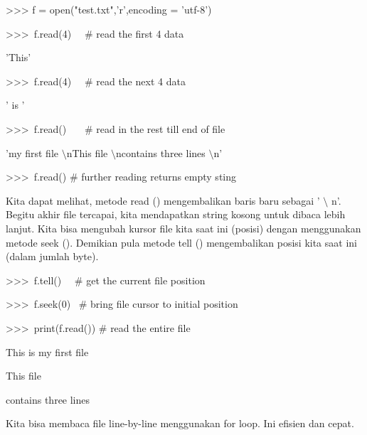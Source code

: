 \vspace{12pt}
\vspace{12pt}
\noindent 
>>> f = open("test.txt",'r',encoding = 'utf-8') \par
\noindent 
>>>~f.read(4)~~   $  \#  $ read the first 4 data \par
\noindent 
'This' \par
\vspace{12pt}
\noindent 
>>>~f.read(4)~~   $  \#  $ read the next 4 data \par
\noindent 
' is ' \par
\vspace{12pt}
\noindent 
>>>~f.read()~~~   $  \#  $ read in the rest till end of file \par
\noindent 
'my first file $  \setminus  $nThis file $  \setminus  $ncontains three lines $  \setminus  $n' \par
\vspace{12pt}
\noindent 
>>>~f.read()   $  \#  $ further reading returns empty sting \par
\vspace{12pt}
Kita dapat melihat, metode read () mengembalikan baris baru sebagai ' $  \setminus  $ n'. Begitu akhir file tercapai, kita mendapatkan string kosong untuk dibaca lebih lanjut. Kita bisa mengubah kursor file kita saat ini (posisi) dengan menggunakan metode seek (). Demikian pula metode tell () mengembalikan posisi kita saat ini (dalam jumlah byte). \par
\vspace{12pt}
\noindent 
>>>~f.tell()~~   $  \#  $ get the current file position \par
{} \par
\vspace{12pt}
\noindent 
>>>~f.seek(0)~   $  \#  $ bring file cursor to initial position \par
{} \par
\vspace{12pt}
\noindent 
>>>~print(f.read())   $  \#  $ read the entire file \par
\noindent 
This is my first file \par
\noindent 
This file \par
\noindent 
contains three lines \par
\vspace{12pt}
\vspace{12pt}
\noindent 
Kita bisa membaca file line-by-line menggunakan for loop. Ini efisien dan cepat. \par
